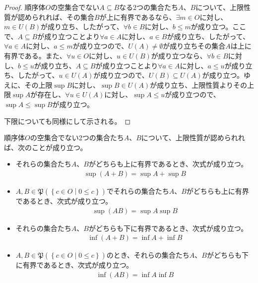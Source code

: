 \documentclass[dvipdfmx]{jsarticle}
\begin{document}
\begin{proof}
順序体$O$の空集合でない$A \subseteq B$なる2つの集合たち$A$、$B$について、上限性質が認められれば、その集合$B$が上に有界であるなら、$\exists m \in O$に対し、$m \in U(B)$が成り立ち、したがって、$\forall b \in B$に対し、$b \leq m$が成り立つ。ここで、$A \subseteq B$が成り立つことより$\forall a \in A$に対し、$a \in B$が成り立ち、したがって、$\forall a \in A$に対し、$a \leq m$が成り立つので、$U(A) \neq \emptyset$が成り立ちその集合$A$は上に有界である。また、$\forall u \in O$に対し、$u \in U(B)$が成り立つなら、$\forall b \in B$に対し、$b \leq u$が成り立ち、$A \subseteq B$が成り立つことより$\forall a \in A$に対し、$a \leq u$が成り立ち、したがって、$u \in U(A)$が成り立つので、$U(B) \subseteq U(A)$が成り立つ。ゆえに、その上限$\sup B$に対し、$\sup B \in U(A)$が成り立ち、上限性質よりその上限$\sup A$が存在し、$\forall u \in U(A)$に対し、$\sup A \leq u$が成り立つので、$\sup A \leq \sup B$が成り立つ。\par
下限についても同様にして示される。
\end{proof}
\begin{thm}\label{4.1.1.17}
順序体$O$の空集合でない2つの集合たち$A$、$B$について、上限性質が認められれば、次のことが成り立つ。
\begin{itemize}
\item
  それらの集合たち$A$、$B$がどちらも上に有界であるとき、次式が成り立つ。
\begin{align*}
\sup(A + B) = \sup A + \sup B
\end{align*}
\item
  $A,B \in \mathfrak{P}\left( \left\{ c \in O \middle| 0 \leq c \right\} \right)$でそれらの集合たち$A$、$B$がどちらも上に有界であるとき、次式が成り立つ。
\begin{align*}
\sup(AB) = \sup A\sup B
\end{align*}
\item
  それらの集合たち$A$、$B$がどちらも下に有界であるとき、次式が成り立つ。
\begin{align*}
\inf(A + B) = \inf A + \inf B
\end{align*}
\item
  $A,B \in \mathfrak{P}\left( \left\{ c \in O \middle| 0 \leq c \right\} \right)$のとき、それらの集合たち$A$、$B$がどちらも下に有界であるとき、次式が成り立つ。
\begin{align*}
\inf(AB) = \inf A\inf B
\end{align*}
\end{itemize}
\end{thm}
\end{document}
